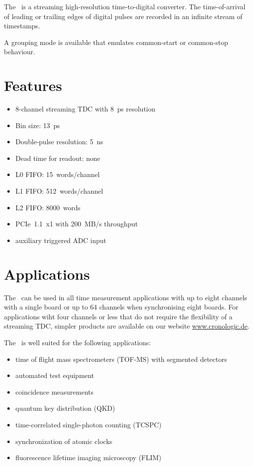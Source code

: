The \deviceName\ is a streaming high-resolution time-to-digital converter. 
The time-of-arrival of leading or trailing edges of digital pulses are recorded in an infinite stream of timestamps.

A grouping mode is available that emulates common-start or common-stop behaviour. 

\section{Features}
	\begin{itemize}
		\item 8-channel streaming TDC with 8~ps resolution
		\item Bin size: 13~ps
		\item Double-pulse resolution: 5~ns
		\item Dead time for readout: none
		\item L0 FIFO: 15~words/channel
		\item L1 FIFO: 512~words/channel
		\item L2 FIFO: 8000~words
		\item PCIe~1.1~x1 with 200~MB/s throughput
		\item auxiliary triggered ADC input
	\end{itemize} 
\section{Applications}
The \deviceName\ can be used in all time measurement applications with up to eight channels with a single board or up to 64 channels when synchronising eight boards. For applications wiht four channels or less that do not require the flexibility of a streaming TDC, simpler products are available on our website \href{https://www.cronologic.de/products/products-overview#tdcdata}{www.cronologic.de}.

The \deviceName\ is well suited for the following applications:
\begin{itemize}
	\item time of flight mass spectrometers (TOF-MS) with segmented detectors
	\item automated test equipment
	\item coincidence measurements
	\item quantum key distribution (QKD)
	\item time-correlated single-photon counting (TCSPC)
	\item synchronization of atomic clocks
	\item fluorescence lifetime imaging microscopy (FLIM)
\end{itemize} 